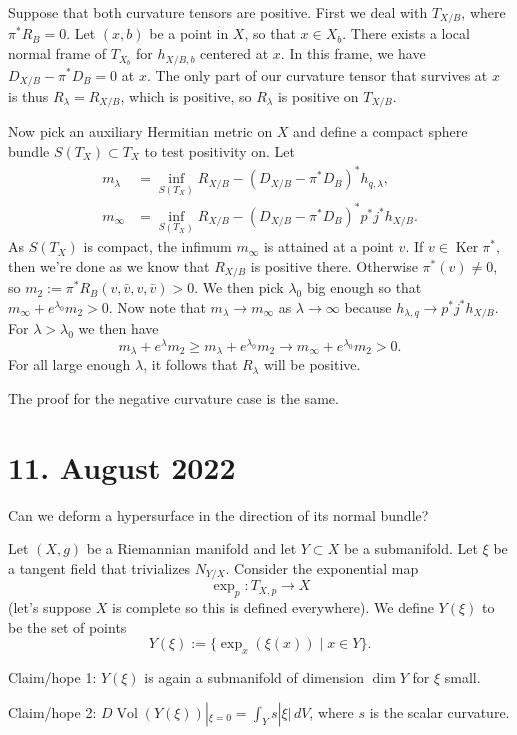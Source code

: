 \documentclass[11pt]{article}
\theoremstyle{definition}
\DeclareMathOperator{\Vol}{Vol}
\DeclareMathOperator{\Ker}{Ker}
\begin{document}
Suppose that both curvature tensors are positive.
First we deal with $T_{X/B}$, where $\pi^*R_B = 0$.
Let $(x,b)$ be a point in $X$, so that $x \in X_b$.
There exists a local normal frame of $T_{X_b}$ for $h_{X/B,b}$ centered at $x$.
In this frame, we have $D_{X/B} - \pi^* D_B = 0$ at $x$.
The only part of our curvature tensor that survives at $x$ is thus $R_\lambda =
R_{X/B}$,
which is positive, so $R_\lambda$ is positive on $T_{X/B}$.

Now pick an auxiliary Hermitian metric on $X$ and define a compact sphere bundle
$S(T_X) \subset T_X$ to test positivity on.
Let
\begin{align*}
m_\lambda &=
\inf_{S(T_X)} R_{X/B}
- (D_{X/B} - \pi^* D_{B})^* h_{q,\lambda},
\\
m_\infty &=
\inf_{S(T_X)} R_{X/B}
- (D_{X/B} - \pi^* D_{B})^* p^* j^* h_{X/B}.
\end{align*}
As $S(T_X)$ is compact, the infimum $m_\infty$ is attained at a point $v$.
If $v \in \Ker \pi^*$, then we're done as we know that $R_{X/B}$ is positive
there.
Otherwise $\pi^*(v) \not= 0$, so $m_2 := \pi^*R_B(v, \bar v, v, \bar v) > 0$.
We then pick $\lambda_0$ big enough so that $m_\infty + e^{\lambda_0} m_2 > 0$.
Now note that
$m_\lambda \to m_\infty$ as $\lambda \to \infty$ because $h_{\lambda,q} \to
p^*j^*h_{X/B}$.
For $\lambda > \lambda_0$ we then have
$$
m_\lambda + e^\lambda m_2
\geq m_\lambda + e^{\lambda_0} m_2
\to m_\infty  + e^{\lambda_0} m_2
> 0.
$$
For all large enough $\lambda$, it follows that $R_\lambda$ will be positive.

The proof for the negative curvature case is the same.



\section*{11. August 2022}

Can we deform a hypersurface in the direction of its normal bundle?

Let $(X, g)$ be a Riemannian manifold and let $Y \subset X$ be a submanifold.
Let $\xi$ be a tangent field that trivializes $N_{Y/X}$.
Consider the exponential map
$$
\exp_p : T_{X,p} \to X
$$
(let's suppose $X$ is complete so this is defined everywhere).
We define $Y(\xi)$ to be the set of points
$$
Y(\xi) := \{ \exp_x(\xi(x)) \mid x \in Y \}.
$$

Claim/hope 1: $Y(\xi)$ is again a submanifold of dimension $\dim Y$ for $\xi$ small.

Claim/hope 2: $D\Vol(Y(\xi))|_{\xi = 0} = \int_Y s |\xi| \, dV$, where $s$ is the
scalar curvature.
\end{document}
